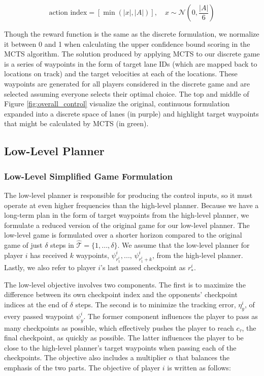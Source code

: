 \begin{equation}
    \text{action index} = [\min(|x|, |A|)], \quad
     x \sim \mathcal{N}(0, \frac{|A|}{6})
\end{equation}

Though the reward function is the same as the discrete formulation, we normalize it between 0 and 1 when calculating the upper confidence bound scoring in the MCTS algorithm. The solution produced by applying MCTS to our discrete game is a series of waypoints in the form of target lane IDs (which are mapped back to locations on track) and the target velocities at each of the locations. These waypoints are generated for all players considered in the discrete game and are selected assuming everyone selects their optimal choice. The top and middle of Figure \ref{fig:overall_control} visualize the original, continuous formulation expanded into a discrete space of lanes (in purple) and highlight target waypoints that might be calculated by MCTS (in green).  

\subsection{Low-Level Planner}
\subsubsection{Low-Level Simplified Game Formulation}
The low-level planner is responsible for producing the control inputs, so it must operate at even higher frequencies than the high-level planner. Because we have a long-term plan in the form of target waypoints from the high-level planner, we formulate a reduced version of the original game for our low-level planner. The low-level game is formulated over a shorter horizon compared to the original game of just $\delta$ steps in $\hat{\mathcal{T}} = \{1, ..., \delta\}$. We assume that the low-level planner for player $i$ has received $k$ waypoints, $\psi^i_{r^i_{1}}, ..., \, \psi^i_{r^i_{1} + k}$, from the high-level planner. Lastly, we also refer to player $i$'s last passed checkpoint as $r^i_*$. 

The low-level objective involves two components. The first is to maximize the difference between its own checkpoint index and the opponents' checkpoint indices at the end of $\delta$ steps. The second is to minimize the tracking error, $\eta^i_y$, of every passed waypoint $\psi^i_{y}$. The former component influences the player to pass as many checkpoints as possible, which effectively pushes the player to reach $c_\tau$, the final checkpoint, as quickly as possible. The latter influences the player to be close to the high-level planner's target waypoints when passing each of the checkpoints. The objective also includes a multiplier $\alpha$ that balances the emphasis of the two parts. The objective of player $i$ is written as follows:

